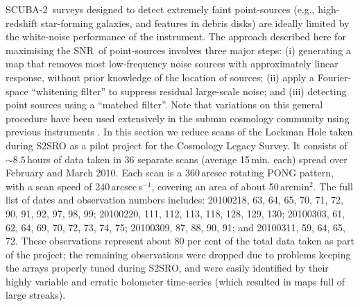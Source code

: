 \documentclass[useAMS,usenatbib,nofootinbib]{mn2e}
\newcommand{\snr}{SNR}
\newcommand{\scuba}{SCUBA-2}
\begin{document}
\scuba\ surveys designed to detect extremely faint point-sources
(e.g., high-redshift star-forming galaxies, and features in debris
disks) are ideally limited by the white-noise performance of the
instrument. The approach described here for maximising the \snr\ of
point-sources involves three major steps: (i) generating a map that
removes most low-frequency noise sources with approximately linear
response, without prior knowledge of the location of sources; (ii)
apply a Fourier-space ``whitening filter'' to suppress residual
large-scale noise; and (iii) detecting point sources using a ``matched
filter''. Note that variations on this general procedure have been
used extensively in the submm cosmology community using previous
instruments
\citep[e.g.,][]{scott2002,borys2003,laurent2005,coppin2006,scott2008,perera2008,devlin2009}.
In this section we reduce scans of the Lockman Hole taken during S2SRO
as a pilot project for the Cosmology Legacy Survey. It consists of
$\sim8.5$\,hours of data taken in 36 separate scans (average
15\,min. each) spread over February and March 2010. Each scan is a
360\,arcsec rotating PONG pattern, with a scan speed of
240\,arcsec\,s$^{-1}$, covering an area of about 50\,arcmin$^2$. The
full list of dates and observation numbers includes: 20100218, 63, 64,
65, 70, 71, 72, 90, 91, 92, 97, 98, 99; 20100220, 111, 112, 113, 118,
128, 129, 130; 20100303, 61, 62, 64, 69, 70, 72, 73, 74, 75; 20100309,
87, 88, 90, 91; and 20100311, 59, 64, 65, 72. These observations
represent about 80 per cent of the total data taken as part of the
project; the remaining observations were dropped due to problems
keeping the arrays properly tuned during S2SRO, and were easily
identified by their highly variable and erratic bolometer time-series
(which resulted in maps full of large streaks).
\end{document}
